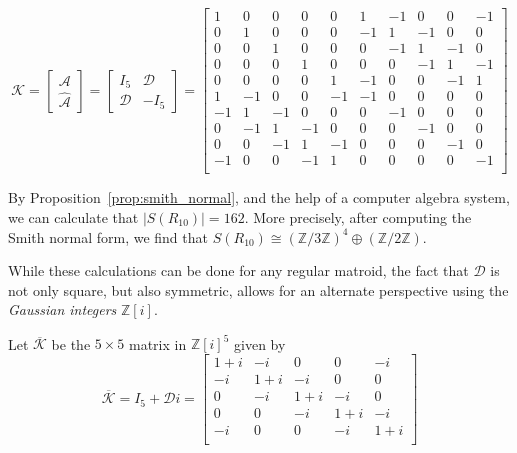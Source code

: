 \documentclass[12p]{amsart}
\numberwithin{equation}{section}
\theoremstyle{plain}
\theoremstyle{definition}
\newcommand{\Z}{\mathbb {Z}}
\begin{document}
\[\mathcal K = \begin{bmatrix} \mathcal A\\ \widehat{\mathcal A} \end{bmatrix} = \begin{bmatrix} I_5 & \mathcal D \\ \mathcal D & -I_5 \end{bmatrix}= \begin{bmatrix}
    1 & 0 & 0 & 0 & 0 &   1 & -1 & 0 & 0 & -1\\
    0 & 1 & 0 & 0 & 0 &   -1 & 1 & -1 & 0 & 0\\
    0 & 0 & 1 & 0 & 0 &   0 & -1 & 1 & -1 & 0\\
    0 & 0 & 0 & 1 & 0 &   0 & 0 & -1 & 1 & -1\\
    0 & 0 & 0 & 0 & 1 &   -1 & 0 & 0 & -1 & 1\\
    1 & -1 & 0 & 0 & -1 &  -1 & 0 & 0 & 0 & 0\\
    -1 & 1 & -1 & 0 & 0 &  0 & -1 & 0 & 0 & 0\\
    0 & -1 & 1 & -1 & 0 &  0 & 0 & -1 & 0 & 0\\
    0 & 0 & -1 & 1 & -1 &  0 & 0 & 0 & -1 & 0\\
    -1 & 0 & 0 & -1 & 1 &  0 & 0 & 0 & 0 & -1\\
\end{bmatrix}\]

By Proposition~\ref{prop:smith_normal}, and the help of a computer algebra system, we can calculate that $|S(R_{10})| = 162$. More precisely, after computing the Smith normal form, we find that $S(R_{10}) \cong (\Z/3\Z)^4 \oplus (\Z/2\Z)$.

While these calculations can be done for any regular matroid, the fact that $\mathcal D$ is not only square, but also symmetric, allows for an alternate perspective using the \emph{Gaussian integers} $\Z[i]$.

Let $\overline{\mathcal K}$ be the $5\times 5$ matrix in $\Z[i]^5$ given by 
\[\overline{\mathcal K} =  I_5 + \mathcal D i =\begin{bmatrix}
    1 + i & -i & 0 & 0 & -i \\
    -i & 1 + i & -i & 0 & 0 \\
    0 & -i & 1 + i & -i & 0 \\
    0 & 0 & -i & 1 + i & -i \\
    -i & 0 & 0 & -i & 1 + i \\
\end{bmatrix}\]
\end{document}

